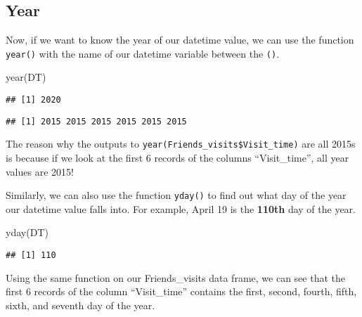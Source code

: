 \documentclass[
]{book}
\newenvironment{Shaded}{\begin{snugshade}}{\end{snugshade}}
\newcommand{\FunctionTok}[1]{\textcolor[rgb]{0.00,0.00,0.00}{#1}}
\newcommand{\NormalTok}[1]{#1}
\newcommand{\SpecialCharTok}[1]{\textcolor[rgb]{0.00,0.00,0.00}{#1}}
\begin{document}
\hypertarget{year}{%
\subsection{Year}\label{year}}

Now, if we want to know the year of our datetime value, we can use the function \texttt{year()} with the name of our datetime variable between the \texttt{()}.

\begin{Shaded}
\begin{Highlighting}[]
\FunctionTok{year}\NormalTok{(DT)}
\end{Highlighting}
\end{Shaded}

\begin{verbatim}
## [1] 2020
\end{verbatim}

\begin{Shaded}
\end{Shaded}

\begin{verbatim}
## [1] 2015 2015 2015 2015 2015 2015
\end{verbatim}

The reason why the outputs to \texttt{year(Friends\_visits\$Visit\_time)} are all 2015s is because if we look at the first 6 records of the columns ``Visit\_time'', all year values are 2015!

Similarly, we can also use the function \texttt{yday()} to find out what day of the year our datetime value falls into. For example, April 19 is the \textbf{110th} day of the year.

\begin{Shaded}
\begin{Highlighting}[]
\FunctionTok{yday}\NormalTok{(DT)}
\end{Highlighting}
\end{Shaded}

\begin{verbatim}
## [1] 110
\end{verbatim}

Using the same function on our Friends\_visits data frame, we can see that the first 6 records of the column ``Visit\_time'' contains the first, second, fourth, fifth, sixth, and seventh day of the year.
\end{document}
